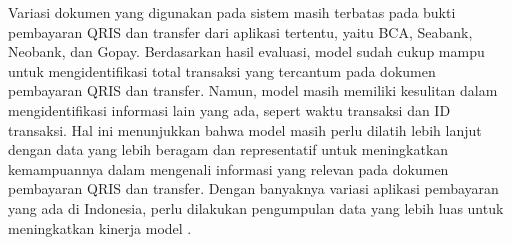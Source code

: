 


Variasi dokumen yang digunakan pada sistem masih terbatas pada bukti pembayaran QRIS dan transfer dari aplikasi tertentu, yaitu BCA, Seabank, Neobank, dan Gopay. Berdasarkan hasil evaluasi, model \donut{} sudah cukup mampu untuk mengidentifikasi total transaksi yang tercantum pada dokumen pembayaran QRIS dan transfer. Namun, model masih memiliki kesulitan dalam mengidentifikasi informasi lain yang ada, sepert waktu transaksi dan ID transaksi. Hal ini menunjukkan bahwa model masih perlu dilatih lebih lanjut dengan data yang lebih beragam dan representatif untuk meningkatkan kemampuannya dalam mengenali informasi yang relevan pada dokumen pembayaran QRIS dan transfer. Dengan banyaknya variasi aplikasi pembayaran yang ada di Indonesia, perlu dilakukan pengumpulan data yang lebih luas untuk meningkatkan kinerja model \donut{}.

